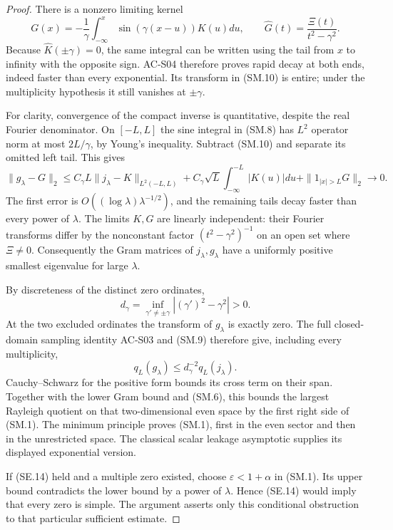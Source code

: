 \begin{proof}
There is a nonzero limiting kernel
\[
 G(x)=-\frac1\gamma\int_{-\infty}^{x}
                        \sin(\gamma(x-u))K(u)du,
 \qquad \widehat G(t)=\frac{\Xi(t)}{t^2-\gamma^2}.
                                                        \tag{SM.10}
\]
Because $\widehat K(\pm\gamma)=0$, the same integral
can be written using the tail from $x$ to infinity
with the opposite sign.  AC-S04 therefore proves
rapid decay at both ends, indeed faster than every
exponential.  Its transform in (SM.10) is entire;
under the multiplicity hypothesis it still vanishes
at $\pm\gamma$.

For clarity, convergence of the compact inverse is
quantitative, despite the real Fourier denominator.
On $[-L,L]$ the sine integral in (SM.8) has $L^2$
operator norm at most $2L/\gamma$, by Young's
inequality.  Subtract (SM.10) and separate its
omitted left tail.  This gives
\[
 \|g_\lambda-G\|_2
 \leq C_\gamma L\|j_\lambda-K\|_{L^2(-L,L)}
   +C_\gamma\sqrt L\int_{-\infty}^{-L}|K(u)|du
   +\|1_{|x|>L}G\|_2\longrightarrow0.             \tag{SM.11}
\]
The first error is $O((\log\lambda)\lambda^{-1/2})$,
and the remaining tails decay faster than every
power of $\lambda$.
The limits $K,G$ are linearly independent: their
Fourier transforms differ by the nonconstant factor
$(t^2-\gamma^2)^{-1}$ on an open set where $\Xi\ne0$.
Consequently the Gram matrices of $j_\lambda,g_\lambda$
have a uniformly positive smallest eigenvalue for
large $\lambda$.

By discreteness of the distinct zero ordinates,
\[
 d_\gamma=
   \inf_{\gamma'\ne\pm\gamma}
                            |(\gamma')^2-\gamma^2|>0.
\]
At the two excluded ordinates the transform of
$g_\lambda$ is exactly zero.
The full closed-domain sampling identity AC-S03
and (SM.9) therefore give, including every multiplicity,
\[
               q_L(g_\lambda)\leq d_\gamma^{-2}q_L(j_\lambda).
                                                        \tag{SM.12}
\]
Cauchy--Schwarz for the positive form bounds its
cross term on their span.  Together with the lower
Gram bound and (SM.6), this bounds the largest
Rayleigh quotient on that two-dimensional even
space by the first right side of (SM.1).
The minimum principle proves (SM.1), first in the
even sector and then in the unrestricted space.
The classical scalar leakage asymptotic supplies
its displayed exponential version.

If (SE.14) held and a multiple zero existed,
choose $\varepsilon<1+\alpha$ in (SM.1).
Its upper bound contradicts the lower bound by
a power of $\lambda$.  Hence (SE.14) would imply
that every zero is simple.  The argument asserts
only this conditional obstruction to that particular
sufficient estimate.
\end{proof}

